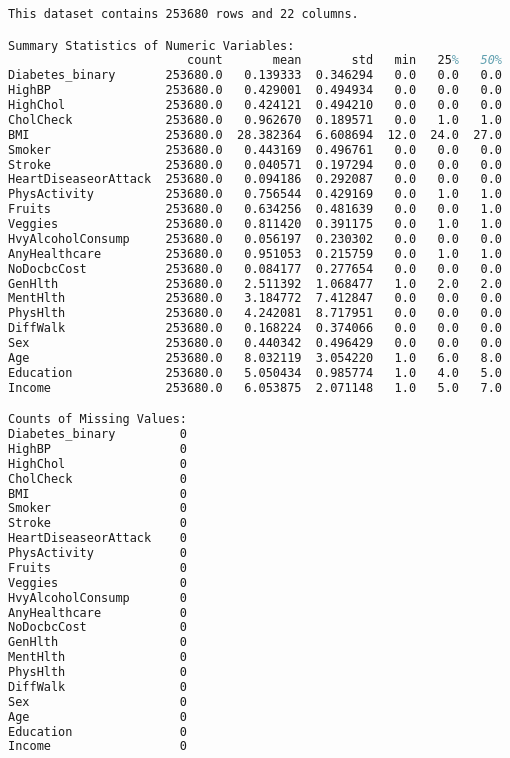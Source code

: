 \documentclass[12pt]{article}
\begin{document}
\begin{lstlisting}[language=TeX]
This dataset contains 253680 rows and 22 columns.

Summary Statistics of Numeric Variables:
                         count       mean       std   min   25%   50%   75%   max
Diabetes_binary       253680.0   0.139333  0.346294   0.0   0.0   0.0   0.0   1.0
HighBP                253680.0   0.429001  0.494934   0.0   0.0   0.0   1.0   1.0
HighChol              253680.0   0.424121  0.494210   0.0   0.0   0.0   1.0   1.0
CholCheck             253680.0   0.962670  0.189571   0.0   1.0   1.0   1.0   1.0
BMI                   253680.0  28.382364  6.608694  12.0  24.0  27.0  31.0  98.0
Smoker                253680.0   0.443169  0.496761   0.0   0.0   0.0   1.0   1.0
Stroke                253680.0   0.040571  0.197294   0.0   0.0   0.0   0.0   1.0
HeartDiseaseorAttack  253680.0   0.094186  0.292087   0.0   0.0   0.0   0.0   1.0
PhysActivity          253680.0   0.756544  0.429169   0.0   1.0   1.0   1.0   1.0
Fruits                253680.0   0.634256  0.481639   0.0   0.0   1.0   1.0   1.0
Veggies               253680.0   0.811420  0.391175   0.0   1.0   1.0   1.0   1.0
HvyAlcoholConsump     253680.0   0.056197  0.230302   0.0   0.0   0.0   0.0   1.0
AnyHealthcare         253680.0   0.951053  0.215759   0.0   1.0   1.0   1.0   1.0
NoDocbcCost           253680.0   0.084177  0.277654   0.0   0.0   0.0   0.0   1.0
GenHlth               253680.0   2.511392  1.068477   1.0   2.0   2.0   3.0   5.0
MentHlth              253680.0   3.184772  7.412847   0.0   0.0   0.0   2.0  30.0
PhysHlth              253680.0   4.242081  8.717951   0.0   0.0   0.0   3.0  30.0
DiffWalk              253680.0   0.168224  0.374066   0.0   0.0   0.0   0.0   1.0
Sex                   253680.0   0.440342  0.496429   0.0   0.0   0.0   1.0   1.0
Age                   253680.0   8.032119  3.054220   1.0   6.0   8.0  10.0  13.0
Education             253680.0   5.050434  0.985774   1.0   4.0   5.0   6.0   6.0
Income                253680.0   6.053875  2.071148   1.0   5.0   7.0   8.0   8.0

Counts of Missing Values:
Diabetes_binary         0
HighBP                  0
HighChol                0
CholCheck               0
BMI                     0
Smoker                  0
Stroke                  0
HeartDiseaseorAttack    0
PhysActivity            0
Fruits                  0
Veggies                 0
HvyAlcoholConsump       0
AnyHealthcare           0
NoDocbcCost             0
GenHlth                 0
MentHlth                0
PhysHlth                0
DiffWalk                0
Sex                     0
Age                     0
Education               0
Income                  0


\end{lstlisting}
\end{document}
